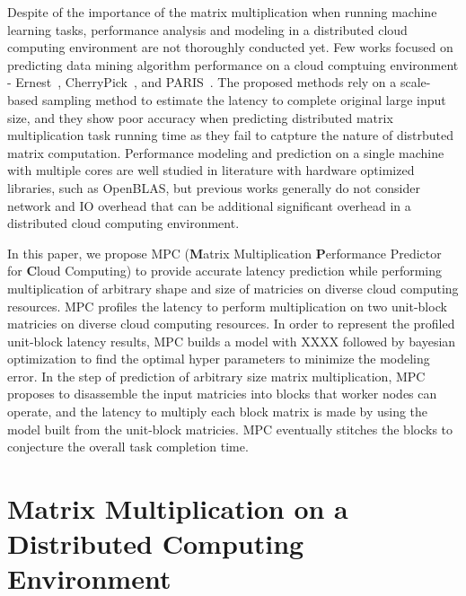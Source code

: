 \documentclass[10pt, conference, compsocconf]{IEEEtran}
\begin{document}
Despite of the importance of the matrix multiplication when running machine learning tasks, performance analysis and modeling in a distributed cloud computing environment are not thoroughly conducted yet. Few works focused on predicting data mining algorithm performance on a cloud comptuing environment - Ernest~\cite{ernest}, CherryPick~\cite{cherrypick}, and PARIS~\cite{paris}. The proposed methods rely on a scale-based sampling method to estimate the latency to complete original large input size, and they show poor accuracy when predicting distributed matrix multiplication task running time as they fail to catpture the nature of distrbuted matrix computation. Performance modeling and prediction on a single machine with multiple cores are well studied in literature with hardware optimized libraries, such as OpenBLAS, but previous works generally do not consider network and IO overhead that can be additional significant overhead in a distributed cloud computing environment.

In this paper, we propose MPC (\textbf{M}atrix Multiplication \textbf{P}erformance Predictor for \textbf{C}loud Computing) to provide accurate latency prediction while performing multiplication of arbitrary shape and size of matricies on diverse cloud computing resources. MPC profiles the latency to perform multiplication on two unit-block matricies on diverse cloud computing resources. In order to represent the profiled unit-block latency results, MPC builds a model with XXXX followed by bayesian optimization to find the optimal hyper parameters to minimize the modeling error. In the step of prediction of arbitrary size matrix multiplication, MPC proposes to disassemble the input matricies into blocks that worker nodes can operate, and the latency to multiply each block matrix is made by using the model built from the unit-block matricies. MPC eventually stitches the blocks to conjecture the overall task completion time.


\section{Matrix Multiplication on a Distributed Computing Environment}\label{sec:distributed-matrix-computation}
\end{document}
